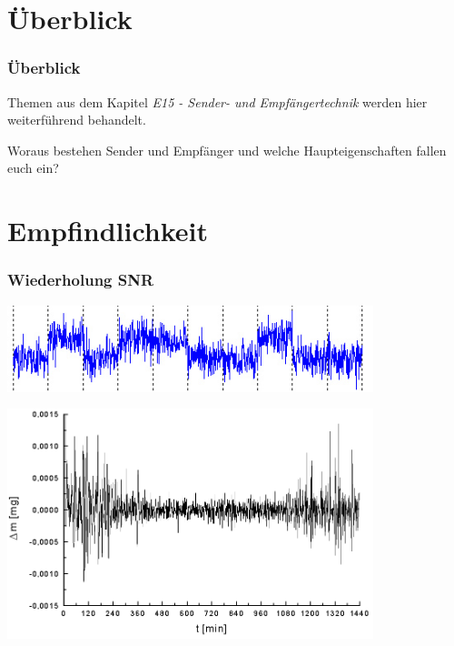

\subtitle{Technik Klasse A 18: \\
  Gerätetechnik \\[2em]}
\date{Stand 12.07.2016}


\section{Überblick}

\begin{frame}
  \frametitle{Überblick}

  Themen aus dem Kapitel \emph{E15 - Sender- und Empfängertechnik} werden hier
  weiterführend behandelt.

  \bigskip


  Woraus bestehen Sender und Empfänger und welche Haupteigenschaften fallen
  euch ein?

\end{frame}

\section{Empfindlichkeit}

\begin{frame}
  \frametitle{Wiederholung SNR}

  \begin{center}
    \includegraphics[width=0.8\textwidth,height=.4\textheight,keepaspectratio]{a18/Received_message.jpg}
    {\tiny \hyperlink{refs}{\cite{wm}}}
  \end{center}

  \begin{center}
    \includegraphics[width=0.8\textwidth,height=.4\textheight,keepaspectratio]{a18/Analyse_thermo_gravimetrique_bruit.png}
    {\tiny \hyperlink{refs}{\cite{wm}}}
  \end{center}

\end{frame}

